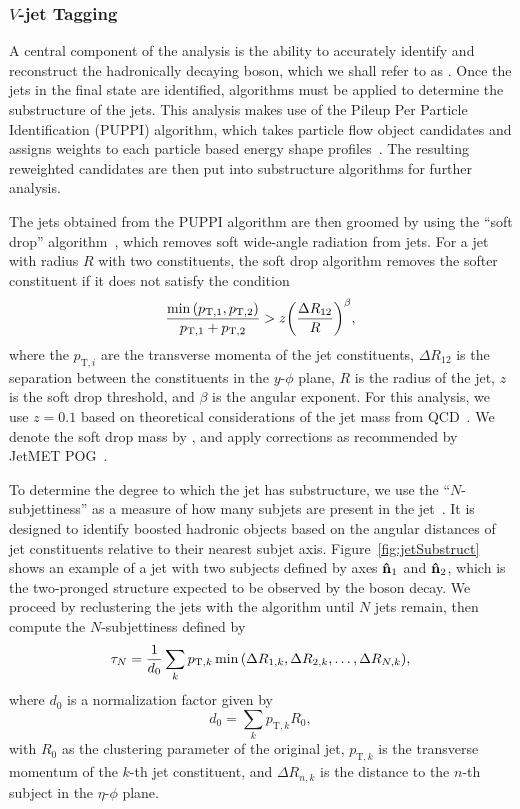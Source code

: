 \subsubsection{$V$-jet Tagging}

A central component of the analysis is the ability to accurately identify and reconstruct the hadronically decaying \VorH boson, which we shall refer to as \Vhad.
Once the jets in the final state are identified, algorithms must be applied to determine the substructure of the jets.
This analysis makes use of the Pileup Per Particle Identification (PUPPI) algorithm, which takes particle flow object candidates and assigns weights to each particle based energy shape profiles~\cite{Bertolini_2014}.
The resulting reweighted candidates are then put into substructure algorithms for further analysis.

The jets obtained from the PUPPI algorithm are then groomed by using the ``soft drop'' algorithm~\cite{Larkoski_2014}, which removes soft wide-angle radiation from jets.
For a jet with radius $R$ with two constituents, the soft drop algorithm removes the softer constituent if it does not satisfy the condition
\begin{equation}
  \frac{\min\pqty{p_{\mathrm{T},1},p_{\mathrm{T},2}}}{p_{\mathrm{T},1}+p_{\mathrm{T},2}}>z\pqty{\frac{\Delta R_{12}}{R}}^\beta,
\end{equation}
where the $p_{\mathrm{T},i}$ are the transverse momenta of the jet constituents, $\Delta R_{12}$ is the separation between the constituents in the $y$-$\phi$ plane, $R$ is the radius of the jet, $z$ is the soft drop threshold, and $\beta$ is the angular exponent.
For this analysis, we use $z=0.1$ based on theoretical considerations of the jet mass from QCD~\cite{Dasgupta_2013,Dasgupta_2013_2}.
We denote the soft drop mass by \MJ, and apply corrections as recommended by JetMET POG~\cite{WZ-tagging}.

To determine the degree to which the jet has substructure, we use the ``$N$-subjettiness'' as a measure of how many subjets are present in the jet~\cite{Thaler_2011,Thaler_2012}.
It is designed to identify boosted hadronic objects based on the angular distances of jet constituents relative to their nearest subjet axis.
Figure~\ref{fig:jetSubstruct} shows an example of a jet with two subjects defined by axes $\vu{n}_1$ and $\vu{n}_2$, which is the two-pronged structure expected to be observed by the \Vhad boson decay.
We proceed by reclustering the jets with the \kt algorithm until $N$ jets remain, then compute the $N$-subjettiness defined by
\begin{equation}
  \tau_N=\frac{1}{d_0}\sum_kp_{\mathrm{T},k}\min\pqty{\Delta R_{1,k},\Delta R_{2,k},\ldots,\Delta R_{N,k}},
\end{equation}
where $d_0$ is a normalization factor given by
\begin{equation}
  d_0=\sum_kp_{\mathrm{T},k}R_0,
\end{equation}
with $R_0$ as the clustering parameter of the original jet, $p_{\mathrm{T},k}$ is the transverse momentum of the $k$-th jet constituent, and $\Delta R_{n,k}$ is the distance to the $n$-th subject in the $\eta$-$\phi$ plane.

